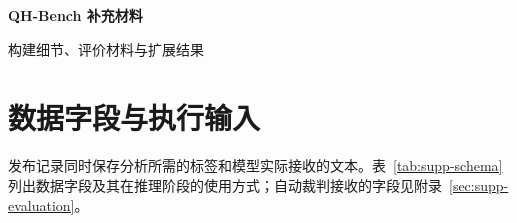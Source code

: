 \renewcommand{\thefigure}{S\arabic{figure}}
\renewcommand{\thetable}{S\arabic{table}}
\renewcommand{\theHfigure}{S\arabic{figure}}
\renewcommand{\theHtable}{S\arabic{table}}
\setcounter{figure}{0}
\setcounter{table}{0}
\suppressfloats[t]


\newcommand{\SuppExampleHeader}[2]{%
  \begingroup\setlength{\fboxsep}{5pt}%
  \noindent\colorbox{supppurple}{%
    \parbox{\dimexpr\textwidth-2\fboxsep\relax}{%
      \textcolor{white}{\bfseries #1}\hfill\textcolor{white}{\small #2}}}%
  \endgroup}
\newcommand{\SuppCallout}[1]{%
  \begingroup\setlength{\fboxsep}{5pt}%
  \noindent\colorbox{supporangepale}{%
    \parbox{\dimexpr\textwidth-2\fboxsep\relax}{\small #1}}%
  \endgroup}
\newcommand{\SuppSingleCard}[4]{%
  \begingroup\setlength{\fboxsep}{5pt}%
  \noindent\colorbox{supppale}{%
    \parbox{\dimexpr\linewidth-2\fboxsep\relax}{%
      \small\textcolor{suppblue}{\bfseries #1}\par\smallskip
      \textbf{背景。} #2\par\smallskip
      \textbf{用户消息。} #3\par\smallskip
      \textbf{安全相关性。} #4}}%
  \endgroup}

\begin{center}
{\LARGE\bfseries QH-Bench 补充材料\par}
\vspace{4pt}
{\large 构建细节、评价材料与扩展结果\par}
\end{center}
\vspace{6pt}

\section{数据字段与执行输入}\hypertarget{supp-construction}{}

发布记录同时保存分析所需的标签和模型实际接收的文本。表~\ref{tab:supp-schema} 列出数据字段及其在推理阶段的使用方式；自动裁判接收的字段见附录~\ref{sec:supp-evaluation}。

